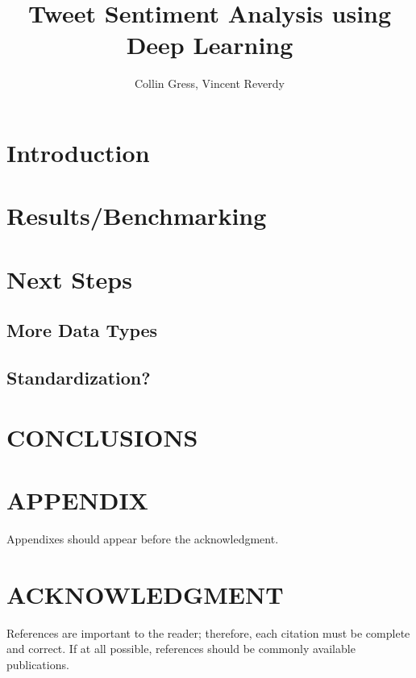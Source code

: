 \documentclass[letterpaper, 10 pt, conference]{ieeeconf}
\title{\LARGE \bf
Tweet Sentiment Analysis using Deep Learning
}
\author{Collin Gress, Vincent Reverdy}
\begin{document}
\maketitle
\thispagestyle{empty}
\pagestyle{empty}
\begin{abstract}
\lipsum[100]
\end{abstract}
\section{Introduction}
\lipsum[200]
\section{Results/Benchmarking}
\lipsum[100]
\section{Next Steps}
\subsection{More Data Types}
\lipsum[50]
\subsection{Standardization?}
\lipsum[50]
\section{CONCLUSIONS}
\lipsum[100]
\addtolength{\textheight}{-12cm} 
\section*{APPENDIX}
Appendixes should appear before the acknowledgment.
\section*{ACKNOWLEDGMENT}
\lipsum[100]
References are important to the reader; therefore, each citation must be complete and correct. If at all possible, references should be commonly available publications.
%
%
\end{document}
